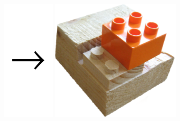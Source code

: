 \documentclass[t]{beamer}
\begin{document}
\begin{frame}
\begin{center}
	\includegraphics[height=6cm]{../img/pfeil.pdf}
	\includegraphics[height=6cm]{../img/fraese-lego.png}
		
	\end{center}
\end{frame}
\end{document}
